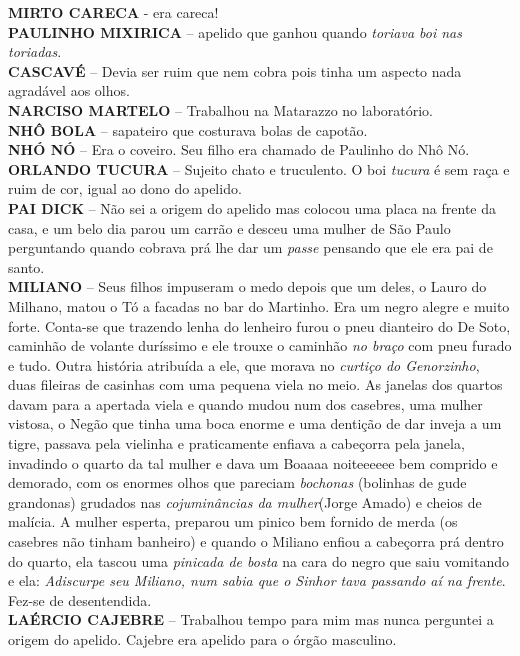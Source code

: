 \documentclass[12pt,brazil,]{book}
\begin{document}
\textbf{MIRTO CARECA} - era careca!\\
\textbf{PAULINHO MIXIRICA} -- apelido que ganhou quando \emph{toriava
boi nas toriadas}.\\
\textbf{CASCAVÉ} -- Devia ser ruim que nem cobra pois tinha um aspecto
nada agradável aos olhos.\\
\textbf{NARCISO MARTELO} -- Trabalhou na Matarazzo no laboratório.\\
\textbf{NHÔ BOLA} -- sapateiro que costurava bolas de capotão.\\
\textbf{NHÓ NÓ} -- Era o coveiro. Seu filho era chamado de Paulinho do
Nhô Nó.\\
\textbf{ORLANDO TUCURA} -- Sujeito chato e truculento. O boi
\emph{tucura} é sem raça e ruim de cor, igual ao dono do apelido.\\
\textbf{PAI DICK} -- Não sei a origem do apelido mas colocou uma placa
na frente da casa, e um belo dia parou um carrão e desceu uma mulher de
São Paulo perguntando quando cobrava prá lhe dar um \emph{passe}
pensando que ele era pai de santo.\\
\textbf{MILIANO} -- Seus filhos impuseram o medo depois que um deles, o
Lauro do Milhano, matou o Tó a facadas no bar do Martinho. Era um negro
alegre e muito forte. Conta-se que trazendo lenha do lenheiro furou o
pneu dianteiro do De Soto, caminhão de volante duríssimo e ele trouxe o
caminhão \emph{no braço} com pneu furado e tudo. Outra história
atribuída a ele, que morava no \emph{curtiço do Genorzinho}, duas
fileiras de casinhas com uma pequena viela no meio. As janelas dos
quartos davam para a apertada viela e quando mudou num dos casebres, uma
mulher vistosa, o Negão que tinha uma boca enorme e uma dentição de dar
inveja a um tigre, passava pela vielinha e praticamente enfiava a
cabeçorra pela janela, invadindo o quarto da tal mulher e dava um Boaaaa
noiteeeeee bem comprido e demorado, com os enormes olhos que pareciam
\emph{bochonas} (bolinhas de gude grandonas) grudados nas
\emph{cojuminâncias da mulher}(Jorge Amado) e cheios de malícia. A
mulher esperta, preparou um pinico bem fornido de merda (os casebres não
tinham banheiro) e quando o Miliano enfiou a cabeçorra prá dentro do
quarto, ela tascou uma \emph{pinicada de bosta} na cara do negro que
saiu vomitando e ela: \emph{Adiscurpe seu Miliano, num sabia que o
Sinhor tava passando aí na frente}. Fez-se de desentendida.\\
\textbf{LAÉRCIO CAJEBRE} -- Trabalhou tempo para mim mas nunca perguntei
a origem do apelido. Cajebre era apelido para o órgão masculino.\\
\end{document}
